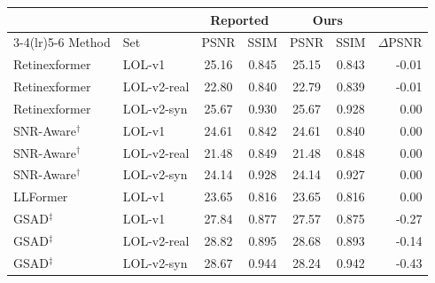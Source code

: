 \begin{tabular}{ll cc cc r}
\toprule
 & & \multicolumn{2}{c}{Reported} & \multicolumn{2}{c}{Ours} & \\
\cmidrule(lr){3-4}\cmidrule(lr){5-6}
Method & Set & PSNR & SSIM & PSNR & SSIM & $\Delta$PSNR \\
\midrule
Retinexformer & LOL-v1 & 25.16 & 0.845 & 25.15 & 0.843 & -0.01 \\
Retinexformer & LOL-v2-real & 22.80 & 0.840 & 22.79 & 0.839 & -0.01 \\
Retinexformer & LOL-v2-syn & 25.67 & 0.930 & 25.67 & 0.928 & 0.00 \\
SNR-Aware$^{\dagger}$ & LOL-v1 & 24.61 & 0.842 & 24.61 & 0.840 & 0.00 \\
SNR-Aware$^{\dagger}$ & LOL-v2-real & 21.48 & 0.849 & 21.48 & 0.848 & 0.00 \\
SNR-Aware$^{\dagger}$ & LOL-v2-syn & 24.14 & 0.928 & 24.14 & 0.927 & 0.00 \\
LLFormer & LOL-v1 & 23.65 & 0.816 & 23.65 & 0.816 & 0.00 \\
GSAD$^{\ddagger}$ & LOL-v1 & 27.84 & 0.877 & 27.57 & 0.875 & -0.27 \\
GSAD$^{\ddagger}$ & LOL-v2-real & 28.82 & 0.895 & 28.68 & 0.893 & -0.14 \\
GSAD$^{\ddagger}$ & LOL-v2-syn & 28.67 & 0.944 & 28.24 & 0.942 & -0.43 \\
\bottomrule
\end{tabular}
